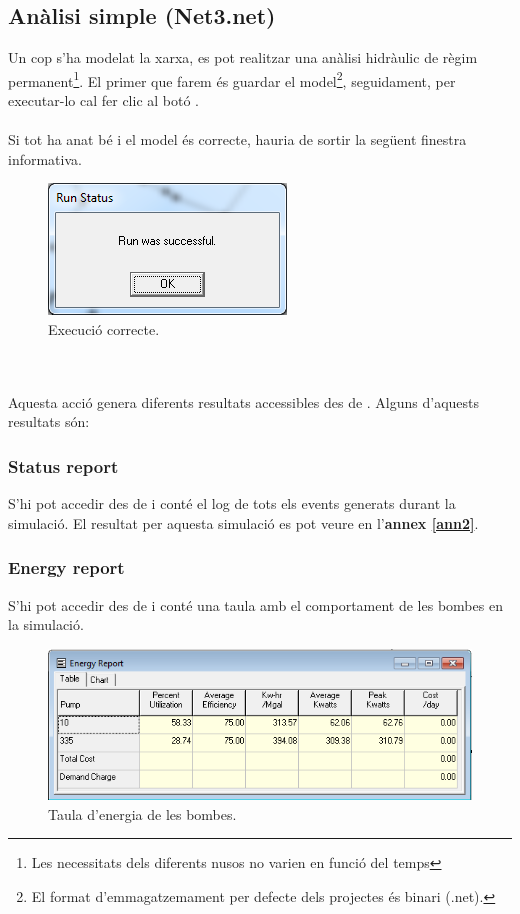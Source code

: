 \documentclass[12pt]{article}
\begin{document}
\subsection{Anàlisi simple (Net3.net)}
Un cop s'ha modelat la xarxa, es pot realitzar una anàlisi hidràulic de règim permanent\footnote{Les necessitats dels diferents nusos no varien en funció del temps}. El primer que farem és guardar el model\footnote{El format d'emmagatzemament per defecte dels projectes és binari (.net).}, seguidament, per executar-lo cal fer clic al botó . 
\\\\Si tot ha anat bé i el model és correcte, hauria de sortir la següent finestra informativa.
\begin{figure}[h!]
	\centering
	\includegraphics[scale=.5]{imatges/epanet/12.png}
	\caption{Execució correcte.}
\end{figure}
\\\\Aquesta acció genera diferents resultats accessibles des de . Alguns d'aquests resultats són:
\subsubsection{Status report}
S'hi pot accedir des de  i conté el log de tots els events generats durant la simulació. El resultat per aquesta simulació es pot veure en l'\textbf{annex \ref{ann2}}.

\subsubsection{Energy report}
S'hi pot accedir des de  i conté una taula amb el comportament de les bombes en la simulació.
\begin{figure}[h!]
	\centering
	\includegraphics[scale=.5]{imatges/epanet/reports/energia.png}
	\caption{Taula d'energia de les bombes.}
\end{figure}
\end{document}
